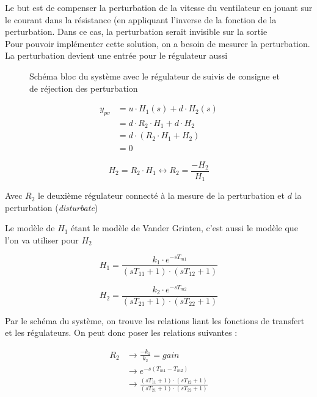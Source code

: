 Le but est de compenser la perturbation de la vitesse du ventilateur en jouant sur le courant dans la résistance (en appliquant l'inverse de la fonction de la perturbation. Dans ce cas, la perturbation serait invisible sur la sortie\\

Pour pouvoir implémenter cette solution, on a besoin de mesurer la perturbation. La perturbation devient une entrée pour le régulateur aussi\\

\begin{figure}
	
    \caption{Schéma bloc du système avec le régulateur de suivis de consigne et de réjection des perturbation}
\end{figure}


\begin{align}
y_{pv} &= u \cdot H_{1}(s) + d \cdot H_{2}(s)\\
	   &= d \cdot R_{2} \cdot H_{1} + d \cdot H_{2}\\
	   &= d \cdot (R_{2} \cdot H_{1} + H_{2})\\
	   &= 0
\end{align}

\begin{equation}
H_{2} = R_{2} \cdot H_{1} \leftrightarrow R_{2} = \frac{-H_{2}}{H_{1}}
\end{equation}

Avec $R_{2}$ le deuxième régulateur connecté à la mesure de la perturbation et $d$ la perturbation (\textit{disturbate})

Le modèle de $H_{1}$ étant le modèle de Vander Grinten, c'est aussi le modèle que l'on va utiliser pour $H_{2}$

\begin{equation}
H_{1} =  \frac{k_{1} \cdot e^{-sT_{m1}}}{(sT_{11} + 1) \cdot (sT_{12} + 1)}
\end{equation}

\begin{equation}
H_{2} =  \frac{k_{2} \cdot e^{-sT_{m2}}}{(sT_{21} + 1) \cdot (sT_{22} + 1)}
\end{equation}


Par le schéma du système, on trouve les relations liant les fonctions de transfert et les régulateurs. On peut donc poser les relations suivantes :

\begin{align}
R_{2} &\rightarrow \frac{-k_{1}}{k_{2}} = gain\\
	  &\rightarrow e^{-s(T_{m1} - T_{m2})}\\
	  &\rightarrow \frac{(sT_{11} + 1) \cdot (sT_{12} + 1)}{(sT_{21} + 1) \cdot (sT_{22} + 1)}\\
\end{align}

